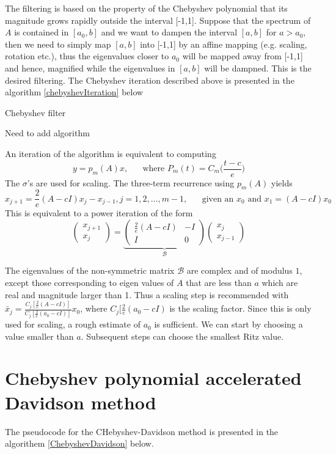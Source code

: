 \documentclass[10pt,a4paper,twoside]{report}
\theoremstyle{definition}
\begin{document}
	The filtering is based on the property of the Chebyshev polynomial that its magnitude grows rapidly outside the interval [-1,1]. Suppose that the spectrum of $A$ is contained in $[a_0,b]$ and we want to dampen the interval $[a,b]$ for $a > a_0$, then we need to simply map $[a,b]$ into [-1,1] by an affine mapping (e.g. scaling, rotation etc.), thus the eigenvalues closer to $a_0$ will be mapped away from [-1,1] and hence, magnified while the eigenvalues in $[a,b]$ will be dampned. This is the desired filtering. 
	The Chebyshev iteration  described above is presented in the algorithm \ref{chebyshevIteration} below

	\IncMargin{2em}
	\begin{algorithm}
		\caption{Chebyshev filter}
		\label{chebyshevIteration}
		Need to add algorithm
	\end{algorithm}

	An iteration of the algorithm is equivalent to computing $$ y=p_m(A)x, \hspace{20pt}\text{where  }P_m(t)=C_m\biggl(\frac{t-c}e{}\biggr) $$
	The $\sigma$'s are used for scaling. The three-term recurrence using $p_m(A)$ yields $$ x_{j+1} = \frac{2}{e}(A-cI)x_j - x_{j-1}, j=1,2,\dots,m-1, \hspace{20pt} \text{given an }  x_0 \text{ and } x_1 = (A-cI)x_0 $$
	This is equivalent to a power iteration of the form$$\begin{pmatrix}x_{j+1}\\ x_j\end{pmatrix} =\underbrace{\begin{pmatrix}\frac{2}{e}(A-cI) & -I \\ I & 0\end{pmatrix}}_\mathcal{B} \begin{pmatrix}x_j \\x_{j-1}\end{pmatrix}$$

	The eigenvalues of the non-symmetric matrix $\mathcal{B}$ are complex and of modulus $1$, except those corresponding to eigen values of $A$ that are less than $a$ which are real and magnitude larger than 1. Thus a scaling step is recommended with $\bar{x}_j = \frac{C_j[\frac{2}{e}(A-cI)]}{C_j[\frac{2}{e}(a_0-cI)]}x_0$, where $C_j[\frac{2}{e}(a_0-cI)$ is the scaling factor. Since this is only used for scaling, a rough estimate of $a_0$ is sufficient. We can start by choosing a value smaller than $a$. Subsequent steps can choose the smallest Ritz value. 

	\section{Chebyshev polynomial accelerated Davidson method}
	The pseudocode for the CHebyshev-Davidson method is presented in the algorithem \ref{ChebyshevDavidson} below. 
\end{document}
